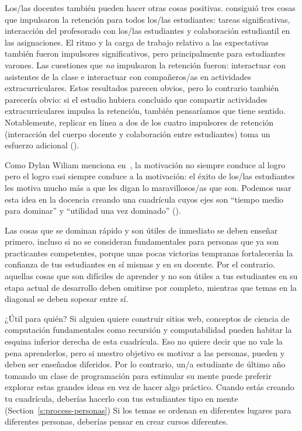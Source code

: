 Los/las docentes también pueden hacer otras cosas positivas.
\cite{Bark2014} consiguió tres cosas que impulsaron la retención para todos los/las estudiantes:
tareas significativas,
interacción del profesorado con los/las estudiantes
y colaboración estudiantil en las asignaciones.
El ritmo y la carga de trabajo relativo a las expectativas también fueron impulsores significativos,
pero principalmente para estudiantes varones.
Las cuestiones que \emph{no} impulsaron la retención
fueron: interactuar con asistentes de la clase
e interactuar con compañeros/as en actividades extracurriculares.
Estos resultados parecen obvios,
pero lo contrario también parecería obvio:
si el estudio hubiera concluido que compartir actividades extracurriculares
impulsa la retención,
también pensaríamos que tiene sentido.
Notablemente,
replicar en línea a dos de los cuatro impulsores de retención (interacción del cuerpo docente y colaboración entre estudiantes)
toma un esfuerzo adicional ().


Como Dylan Wiliam menciona en~\cite{Hend2017},
la motivación no siempre conduce al logro 
pero el logro casi siempre conduce a la motivación:
el éxito de los/las estudiantes les motiva mucho más a que les digan lo maravillosos/as que son.
Podemos usar esta idea en la docencia
creando una cuadrícula cuyos ejes son ``tiempo medio para dominar''
y ``utilidad una vez dominado'' ().


Las cosas que se dominan rápido y son útiles de inmediato se deben enseñar primero,
incluso si no se consideran fundamentales para personas que ya son practicantes competentes,
porque unas pocas victorias tempranas fortalecerán la confianza de tus estudiantes en sí mismas y en su docente.
Por el contrario.
aquellas cosas que son difíciles de aprender y no son útiles a tus estudiantes en su etapa actual de desarrollo
deben omitirse por completo,
mientras que temas en la diagonal se deben sopesar entre sí.

\newpage
\begin{aside}{¿Útil para quién?}
  Si alguien quiere construir sitios web,
  conceptos de ciencia de computación fundamentales como recursión y computabilidad
  pueden habitar la esquina inferior derecha de esta cuadrícula. 
  Eso no quiere decir que no vale la pena aprenderlos,
  pero si nuestro objetivo es motivar a las personas,
  pueden y deben ser enseñados diferidos.
  Por lo contrario,
  un/a estudiante de último año tomando un clase de programación para estimular su mente
  puede preferir explorar estas grandes ideas en vez de hacer algo práctico.
  Cuando estás creando tu cuadrícula,
  deberías hacerlo con tus estudiantes tipo en mente
  (Section~\ref{s:process-personas})
  Si los temas se ordenan en diferentes lugares para diferentes personas,
  deberías pensar en crear cursos diferentes.
\end{aside}

